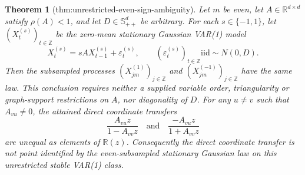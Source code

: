 \documentclass{article}
\newtheorem{theorem}{Theorem}
\begin{document}
\begin{theorem}[thm:unrestricted-even-sign-ambiguity]\label{thm:unrestricted-even-sign-ambiguity}
Let \(m\) be even, let \(A\in\mathbb R^{d\times d}\) satisfy \(\rho(A)<1\), and let \(D\in\mathbb S_{++}^{d}\) be arbitrary.  For each \(s\in\{-1,1\}\), let \((X_t^{(s)})_{t\in\mathbb Z}\) be the zero-mean stationary Gaussian VAR(1) model
\[
 X_t^{(s)}=sA X_{t-1}^{(s)}+\varepsilon_t^{(s)},
 \qquad
 (\varepsilon_t^{(s)})_{t\in\mathbb Z}\mathrel{\mathrm{iid}}\sim N(0,D).
\]
Then the subsampled processes \((X_{jm}^{(1)})_{j\in\mathbb Z}\) and \((X_{jm}^{(-1)})_{j\in\mathbb Z}\) have the same law.  This conclusion requires neither a supplied variable order, triangularity or graph-support restrictions on \(A\), nor diagonality of \(D\).  For any \(u\ne v\) such that \(A_{vu}\ne0\), the attained direct coordinate transfers
\[
 \frac{A_{vu}z}{1-A_{vv}z}
 \quad\text{and}\quad
 \frac{-A_{vu}z}{1+A_{vv}z}
\]
are unequal as elements of \(\mathbb R(z)\).  Consequently the direct coordinate transfer is not point identified by the even-subsampled stationary Gaussian law on this unrestricted stable VAR(1) class.
\end{theorem}
\end{document}
